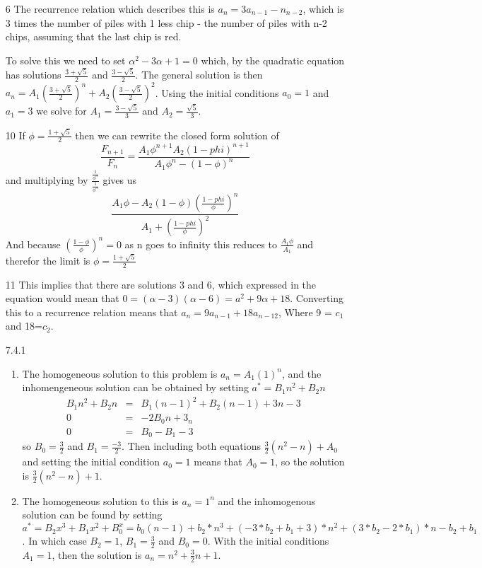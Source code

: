 \documentclass{article}
\begin{document}
\begin{enumerate}
\item[6]
The recurrence relation which describes this is $a_n=3a_{n-1} - n_{n-2}$, which is 3 times the number of piles with 1 less chip - the number of piles with n-2 chips, assuming that the last chip is red. 

To solve this we need to set $\alpha^2-3\alpha+1=0$ which, by the quadratic equation has solutions $\frac{3+\sqrt{5}}{2}$ and $\frac{3-\sqrt{5}}{2}$. The general solution is then $a_n=A_1(\frac{3+\sqrt{5}}{2})^n + A_2(\frac{3-\sqrt{5}}{2})^2$. Using the initial conditions $a_0 = 1$ and $a_1=3$ we solve for $A_1 = \frac{3-\sqrt{5}}{3}$ and $A_2 = \frac{\sqrt{5}}{3}$. 
\item[10]
If $\phi = \frac{1+\sqrt{5}}{2}$ then we can rewrite the closed form solution of
 \[
\frac{F_{n+1}}{F_{n}} = \frac{A_1\phi^{n+1}A_2(1-phi)^{n+1}}{A_1\phi^n-(1-\phi)^n}
\] 
and multiplying by $\frac{\frac{1}{\phi^n}}{\frac{1}{\phi^n}}$ gives us 
\[
\frac{A_1\phi-A_2(1-\phi)(\frac{1-phi}{\phi})^n}{A_1+(\frac{1-phi}{\phi})^2}
\]
And because $(\frac{1-\phi}{\phi})^n = 0$ as n goes to infinity this reduces to 
$\frac{A_1\phi}{A_1}$ and therefor the limit is $\phi = \frac{1+\sqrt{5}}{2}$
\item[11]
This implies that there are solutions 3 and 6, which expressed in the equation would mean that $0=(\alpha-3)(\alpha-6) = a^2+9\alpha+18$. Converting this to a recurrence relation means that $a_n=9a_{n-1} + 18a_{n-12}$, Where 9 = $c_1$ and 18=$c_2$. 

\item[7.4.1]
\begin{enumerate}
\item
The homogeneous solution to this problem is $a_n=A_1(1)^n$, and the inhomengeneous solution can be obtained by setting $a^*= B_1n^2+B_2n$ 
\begin{eqnarray}
B_1n^2+B_2n &=& B_1(n-1)^2+B_2(n-1) + 3n -3 \\
0 &=& -2B_0n + 3_n \\
0 &=& B_0-B_1-3 
\end{eqnarray}
so $B_0=\frac{3}{2}$ and $B_1=\frac{-3}{2}$. Then including both equations $\frac{3}{2}(n^2-n)+A_0$ and setting the initial condition $a_0=1$ means that $A_0=1$, so the solution is $\frac{3}{2}(n^2-n)+1$. 

\item
The homogeneous solution to this is $a_n=1^n$ and the inhomogenous solution can be found by setting $a^*=B_2x^3+B_1x^2 + B_0^x = b_0(n-1)+b_2*n^3+(-3*b_2+b_1+3)*n^2+(3*b_2-2*b_1)*n-b_2+b_1$. In which case $B_2=1$, $B_1= \frac{3}{2}$ and $B_0 = 0$. With the initial conditions $A_1 = 1$, then the solution is $a_n = n^2 + \frac{3}{2}n + 1$. 


\end{enumerate}
\end{enumerate}
\end{document}
